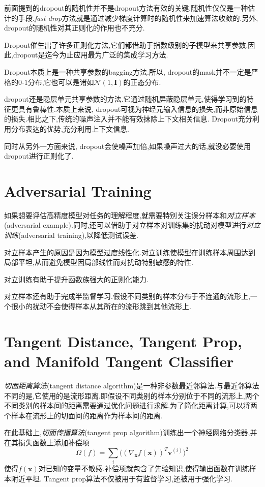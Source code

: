 前面提到的dropout的随机性并不是dropout方法有效的关键,随机性仅仅是一种估计的手段.\textit{fast drop}方法就是通过减少梯度计算时的随机性来加速算法收敛的.另外, dropout的随机性对其正则化的作用也不充分.

Dropout催生出了许多正则化方法,它们都借助于指数级别的子模型来共享参数.因此,dropout是迄今为止应用最为广泛的集成学习方法.

Dropout本质上是一种共享参数的bagging方法.所以, dropout的mask并不一定是严格的$0$-$1$分布,它也可以是诸如$\mathcal N(1,\bm I)$的正态分布.

dropout还是隐层单元共享参数的方法.它通过随机屏蔽隐层单元,使得学习到的特征更具有鲁棒性.本质上来说, dropout可视为神经元输入信息的损失,而非原始信息的损失.相比之下,传统的噪声注入并不能有效抹除上下文相关信息. Dropout充分利用分布表达的优势,充分利用上下文信息.

同时从另外一方面来说, dropout会使噪声加倍,如果噪声过大的话,就没必要使用dropout进行正则化了.

\section{Adversarial Training}

如果想要评估高精度模型对任务的理解程度,就需要特别关注误分样本和\textit{对立样本}(adversarial example).同时,还可以借助于对立样本对训练集的扰动对模型进行\textit{对立训练}(adversarial training),以降低测试误差.

对立样本产生的原因是因为模型过度线性化.对立训练使模型在训练样本周围达到局部平坦,从而避免模型因局部线性而对扰动特别敏感的特性.

对立训练有助于提升函数族强大的正则化能力.

对立样本还有助于完成半监督学习.假设不同类别的样本分布于不连通的流形上,一个很小的扰动不会使得样本从其所在的流形跳到其他流形上.

\section{Tangent Distance, Tangent Prop, and Manifold Tangent Classifier}

\textit{切面距离算法}(tangent distance algorithm)是一种非参数最近邻算法.与最近邻算法不同的是,它使用的是流形距离.即假设不同类别的样本分别位于不同的流形上,两个不同类别的样本间的距离需要通过优化问题进行求解.为了简化距离计算,可以将两个样本在流形上的切面间的距离作为样本间的距离.

在此基础上,\textit{切面传播算法}(tangent prop algorithm)训练出一个神经网络分类器,并在其损失函数上添加补偿项
\begin{equation}
\Omega(f)=\sum_i\Big((\nabla_{\bm x}f(\bm x))^T\bm v^{(i)}\Big)^2
\end{equation}
使得$f(\bm x)$对已知的变量不敏感.补偿项就包含了先验知识,使得输出函数在训练样本附近平坦. Tangent prop算法不仅被用于有监督学习,还被用于强化学习.

